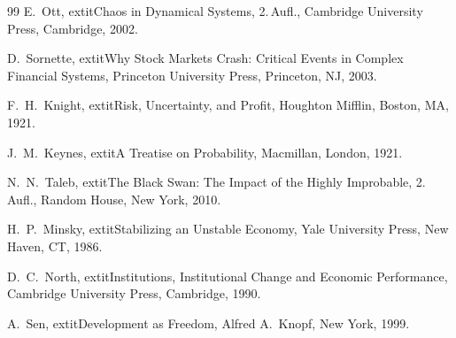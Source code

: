 \documentclass[a4paper,12pt,twoside]{report}
\theoremstyle{definition}
\begin{document}
\begin{thebibliography}{99}
E.~Ott,
	extit{Chaos in Dynamical Systems},
2.\,Aufl., Cambridge University Press, Cambridge, 2002.

D.~Sornette,
	extit{Why Stock Markets Crash: Critical Events in Complex Financial Systems},
Princeton University Press, Princeton, NJ, 2003.

F.~H.~Knight,
	extit{Risk, Uncertainty, and Profit},
Houghton Mifflin, Boston, MA, 1921.

J.~M.~Keynes,
	extit{A Treatise on Probability},
Macmillan, London, 1921.

N.~N.~Taleb,
	extit{The Black Swan: The Impact of the Highly Improbable},
2.\,Aufl., Random House, New York, 2010.

H.~P.~Minsky,
	extit{Stabilizing an Unstable Economy},
Yale University Press, New Haven, CT, 1986.

D.~C.~North,
	extit{Institutions, Institutional Change and Economic Performance},
Cambridge University Press, Cambridge, 1990.

A.~Sen,
	extit{Development as Freedom},
Alfred A.~Knopf, New York, 1999.

\end{thebibliography}
\end{document}
